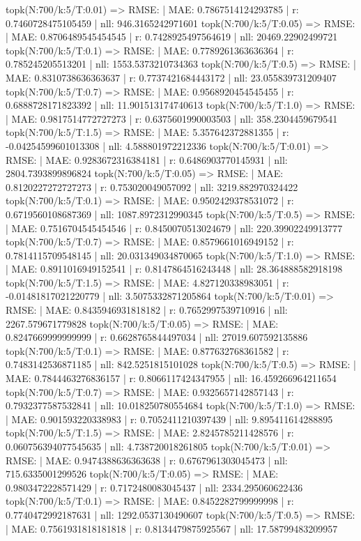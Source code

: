 topk(N:700/k:5/T:0.01) => RMSE: | MAE: 0.7867514124293785 | r: 0.7460728475105459 | nll: 946.3165242971601
topk(N:700/k:5/T:0.05) => RMSE: | MAE: 0.8706489545454545 | r: 0.7428925497564619 | nll: 20469.22902499721
topk(N:700/k:5/T:0.1) => RMSE: | MAE: 0.7789261363636364 | r: 0.785245205513201 | nll: 1553.5373210734363
topk(N:700/k:5/T:0.5) => RMSE: | MAE: 0.8310738636363637 | r: 0.7737421684443172 | nll: 23.055839731209407
topk(N:700/k:5/T:0.7) => RMSE: | MAE: 0.9568920454545455 | r: 0.6888728171823392 | nll: 11.901513174740613
topk(N:700/k:5/T:1.0) => RMSE: | MAE: 0.9817514772727273 | r: 0.6375601990003503 | nll: 358.2304459679541
topk(N:700/k:5/T:1.5) => RMSE: | MAE: 5.357642372881355 | r: -0.04254599601013308 | nll: 4.588801972212336
topk(N:700/k:5/T:0.01) => RMSE: | MAE: 0.9283672316384181 | r: 0.6486903770145931 | nll: 2804.7393899896824
topk(N:700/k:5/T:0.05) => RMSE: | MAE: 0.8120227272727273 | r: 0.753020049057092 | nll: 3219.882970324422
topk(N:700/k:5/T:0.1) => RMSE: | MAE: 0.9502429378531072 | r: 0.6719560108687369 | nll: 1087.8972312990345
topk(N:700/k:5/T:0.5) => RMSE: | MAE: 0.7516704545454546 | r: 0.8450070513024679 | nll: 220.39902249913777
topk(N:700/k:5/T:0.7) => RMSE: | MAE: 0.8579661016949152 | r: 0.7814115709548145 | nll: 20.031349034870065
topk(N:700/k:5/T:1.0) => RMSE: | MAE: 0.8911016949152541 | r: 0.8147864516243448 | nll: 28.364888582918198
topk(N:700/k:5/T:1.5) => RMSE: | MAE: 4.827120338983051 | r: -0.01481817021220779 | nll: 3.5075332871205864
topk(N:700/k:5/T:0.01) => RMSE: | MAE: 0.8435946931818182 | r: 0.7652997539710916 | nll: 2267.579671779828
topk(N:700/k:5/T:0.05) => RMSE: | MAE: 0.8247669999999999 | r: 0.6628765844497034 | nll: 27019.607592135886
topk(N:700/k:5/T:0.1) => RMSE: | MAE: 0.877632768361582 | r: 0.7483142536871185 | nll: 842.5251815101028
topk(N:700/k:5/T:0.5) => RMSE: | MAE: 0.7844463276836157 | r: 0.8066117424347955 | nll: 16.459266964211654
topk(N:700/k:5/T:0.7) => RMSE: | MAE: 0.9325657142857143 | r: 0.7932377587532841 | nll: 10.018250780554684
topk(N:700/k:5/T:1.0) => RMSE: | MAE: 0.901593220338983 | r: 0.7052411210397439 | nll: 9.895411614288895
topk(N:700/k:5/T:1.5) => RMSE: | MAE: 2.8245785211428576 | r: 0.060756394077545635 | nll: 4.738720018261805
topk(N:700/k:5/T:0.01) => RMSE: | MAE: 0.9474388636363638 | r: 0.6767961303045473 | nll: 715.6335001299526
topk(N:700/k:5/T:0.05) => RMSE: | MAE: 0.9803472228571429 | r: 0.7172480083045437 | nll: 2334.295060622436
topk(N:700/k:5/T:0.1) => RMSE: | MAE: 0.8452282799999998 | r: 0.7740472992187631 | nll: 1292.0537130490607
topk(N:700/k:5/T:0.5) => RMSE: | MAE: 0.7561931818181818 | r: 0.8134479875925567 | nll: 17.58799483209957
